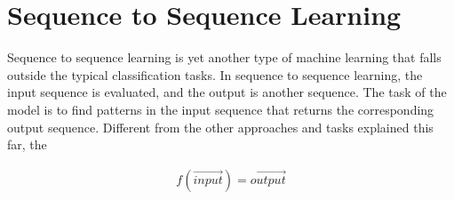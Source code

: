 
\section{Sequence to Sequence Learning}
Sequence to sequence learning is yet another type of machine learning that falls outside the typical classification tasks. In sequence to sequence learning, the input sequence is evaluated, and the output is another sequence. The task of the model is to find patterns in the input sequence that returns the corresponding output sequence. Different from the other approaches and tasks explained this far, the 

\begin{equation}
    \begin{aligned}
        f(\vec{input}) = \vec{output}
    \end{aligned}
\end{equation}